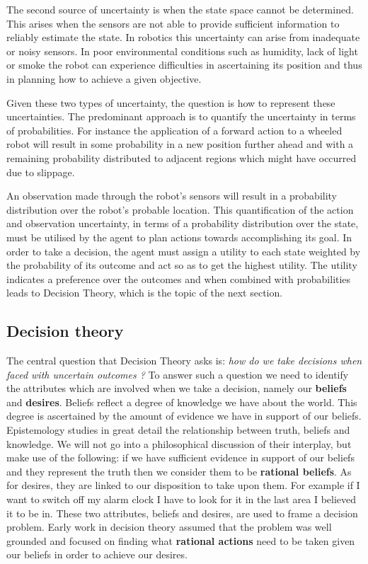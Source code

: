 The second source of uncertainty is when the state space cannot be determined. This arises when the sensors are not able to 
provide sufficient information to reliably estimate the state. In robotics this uncertainty can arise from inadequate or noisy sensors. 
In poor environmental conditions such as humidity, lack of light or smoke the robot can experience difficulties in 
ascertaining its position and thus in planning how to achieve a given objective.

Given these two types of uncertainty, the question is how to represent these uncertainties. The predominant approach 
is to quantify the uncertainty in terms of probabilities. For instance the application of a forward action to a wheeled robot 
will result in some probability in a new position further ahead and with a remaining probability distributed to adjacent 
regions which might have occurred due to slippage.

An observation made through the robot's sensors will result in a probability distribution over the robot's probable location.
This quantification of the action and observation uncertainty, in terms of a probability distribution over the state, must
be utilised by the agent to plan actions towards accomplishing its goal. In order to take a decision, the agent must assign a utility 
to each state weighted by the probability of its outcome and act so as to get the highest utility. The utility indicates a 
preference over the outcomes and when combined with probabilities leads to Decision Theory, which is the topic of the next section. 

\subsection{Decision theory}\label{sec:ch2_DT}

The central question that Decision Theory asks is: \textit{how do we take decisions when faced with uncertain outcomes ?} To answer
such a question we need to identify the attributes which are involved when we take a decision, namely our \textbf{beliefs} and 
\textbf{desires}. Beliefs reflect a degree of knowledge we have about the world. This degree is ascertained by 
the amount of evidence we have in support of our beliefs. Epistemology studies in great detail the relationship between 
truth, beliefs and knowledge. We will not go into a philosophical discussion of their interplay, but make use of the following: 
if we have sufficient evidence in support of our beliefs and they represent the truth then we consider them to 
be \textbf{rational beliefs}. As for desires, they are linked to our disposition to take upon them. For 
example if I want to switch off my alarm clock I have to look for it in the last area I believed it to be in. 
These two attributes, beliefs and desires, are used to frame a decision problem. Early work in decision theory assumed 
that the problem was well grounded and focused on finding what \textbf{rational actions} need to be taken given our beliefs 
in order to achieve our desires. 

